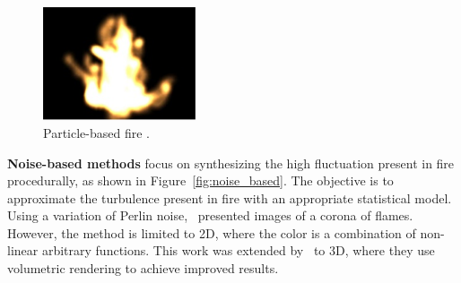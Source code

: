 \begin{figure}[htpb!]
        \centering
		\includegraphics[width=0.4\textwidth]{img/perry_1994}
        \caption{Particle-based fire \cite{Perry:1994}.}
        \label{fig:particle_based}
\end{figure}

\textbf{Noise-based methods} focus on synthesizing the high fluctuation present in fire procedurally, as shown in Figure~\ref{fig:noise_based}.
The objective is to approximate the turbulence present in fire with an appropriate statistical model.
Using a variation of Perlin noise,~\cite{Perlin:1985} presented images of a corona of flames.
However, the method is limited to 2D, where the color is a combination of non-linear arbitrary functions.
This work was extended by~\cite{Perlin:1989} to 3D, where they use volumetric rendering to achieve improved results.

